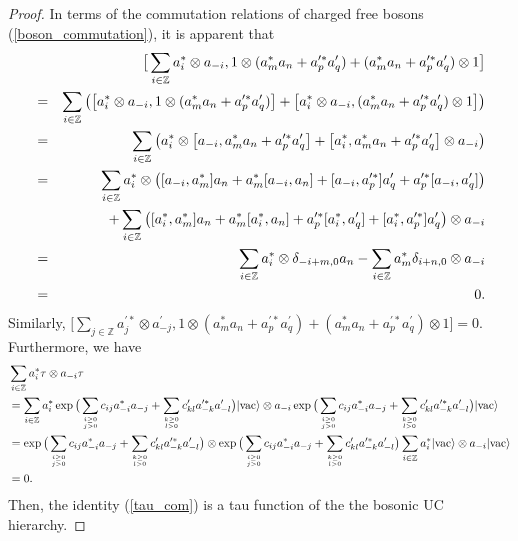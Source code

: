 \documentclass[11pt,reqno]{amsart}
\numberwithin{equation}{section}
\begin{document}
\begin{proof}
In terms of the commutation relations of charged free bosons (\ref{boson_commutation}), it is apparent that
\begin{eqnarray}\label{solution_jiaohuan}
&&\big[\sum\limits_{i\in\mathbb{Z}}a^{\ast}_{i}\otimes a_{-i},1\otimes(a^{\ast}_{m}a_{n}+a^{\prime\ast}_{p}a^{\prime}_{q})
+(a^{\ast}_{m}a_{n}+a^{\prime\ast}_{p}a^{\prime}_{q})\otimes1\big]\notag\\
&=&\sum\limits_{i\in\mathbb{Z}}\left(\left[a^{\ast}_{i}\otimes a_{-i},1\otimes(a^{\ast}_{m}a_{n}+a^{\prime\ast}_{p}a^{\prime}_{q})\right]
+\left[a^{\ast}_{i}\otimes a_{-i},(a^{\ast}_{m}a_{n}+a^{\prime\ast}_{p}a^{\prime}_{q})\otimes1\right]\right)\notag\\
&=&\sum\limits_{i\in\mathbb{Z}}\left(a^{\ast}_{i}\otimes \left[a_{-i},a^{\ast}_{m}a_{n}+a^{\prime\ast}_{p}a^{\prime}_{q}\right]+
\left[a^{\ast}_{i},a^{\ast}_{m}a_{n}+a^{\prime\ast}_{p}a^{\prime}_{q}\right]\otimes a_{-i}\right)\notag\\
&=&\sum\limits_{i\in\mathbb{Z}}a^{\ast}_{i}\otimes\left([a_{-i},a^{\ast}_{m}]a_{n}+
a^{\ast}_{m}[a_{-i},a_{n}]+[a_{-i},a^{\prime\ast}_{p}]a^{\prime}_{q}+
a^{\prime\ast}_{p}[a_{-i},a^{\prime}_{q}]\right)\notag\\
&&+\sum\limits_{i\in\mathbb{Z}}\left([a^{\ast}_{i},a^{\ast}_{m}]a_{n}
+a^{\ast}_{m}[a^{\ast}_{i},a_{n}]+a^{\prime\ast}_{p}[a^{\ast}_{i},a^{\prime}_{q}]
+[a^{\ast}_{i},a^{\prime\ast}_{p}]a^{\prime}_{q}\right)\otimes a_{-i}\notag\\
&=&\sum\limits_{i\in\mathbb{Z}}a^{\ast}_{i}\otimes \delta_{-i+m,0}a_{n}-\sum\limits_{i\in\mathbb{Z}}a^{\ast}_{m}\delta_{i+n,0}\otimes a_{-i}\notag\\
&=&0.
\end{eqnarray}
Similarly, $\big[\sum\limits_{j\in\mathbb{Z}}a^{\prime\ast}_{j}\otimes a^{\prime}_{-j},1\otimes(a^{\ast}_{m}a_{n}+a^{\prime\ast}_{p}a^{\prime}_{q})
+(a^{\ast}_{m}a_{n}+a^{\prime\ast}_{p}a^{\prime}_{q})\otimes1\big]=0$.
Furthermore, we have
\begin{align}
&\sum\limits_{i\in\mathbb{Z}}a^{\ast}_{i}\tau\otimes a_{-i}\tau\notag\\
&=
\sum\limits_{i\in\mathbb{Z}}a^{\ast}_{i}\exp\big(\sum\limits_{i\geq0\atop{j>0}}c_{ij}a^{\ast}_{-i}a_{-j}+
\sum\limits_{k\geq0\atop{l>0}}c^{\prime}_{kl}a^{\prime\ast}_{-k}a^{\prime}_{-l}\big)
|\text{vac}\rangle\otimes a_{-i}\exp\big(\sum\limits_{i\geq0\atop{j>0}}c_{ij}a^{\ast}_{-i}a_{-j}+
\sum\limits_{k\geq0\atop{l>0}}c^{\prime}_{kl}a^{\prime\ast}_{-k}a^{\prime}_{-l}\big)
|\text{vac}\rangle\notag\\
&=\exp\big(\sum\limits_{i\geq0\atop{j>0}}c_{ij}a^{\ast}_{-i}a_{-j}+
\sum\limits_{k\geq0\atop{l>0}}c^{\prime}_{kl}a^{\prime\ast}_{-k}a^{\prime}_{-l}\big)
\otimes\exp\big(\sum\limits_{i\geq0\atop{j>0}}c_{ij}a^{\ast}_{-i}a_{-j}+
\sum\limits_{k\geq0\atop{l>0}}c^{\prime}_{kl}a^{\prime\ast}_{-k}a^{\prime}_{-l}\big)
\sum\limits_{i\in\mathbb{Z}}a^{\ast}_{i}|\text{vac}\rangle\otimes a_{-i}|\text{vac}\rangle\notag\\
&=0.
\end{align}
Then, the identity (\ref{tau_com}) is a tau function of the the bosonic UC hierarchy.
\end{proof}
\end{document}
